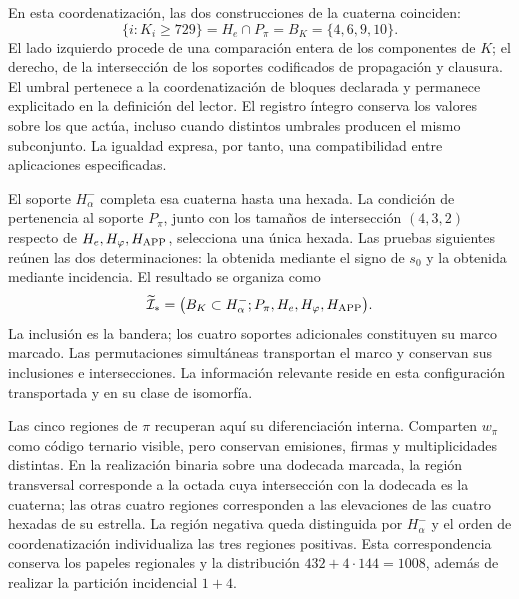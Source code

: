 En esta coordenatización, las dos construcciones de la cuaterna coinciden:
\begin{equation}
 \{i:K_i\geq729\}
 =H_e\cap P_\pi=B_K=\{4,6,9,10\}.
 \label{inc-ampl-cuaterna}
\end{equation}
El lado izquierdo procede de una comparación entera de los componentes
de $K$; el derecho, de la intersección de los soportes codificados de
propagación y clausura. El umbral pertenece a la coordenatización de bloques
declarada y permanece explicitado en la definición del lector. El
registro íntegro conserva los valores sobre los que actúa, incluso cuando
distintos umbrales producen el mismo subconjunto. La igualdad expresa,
por tanto, una compatibilidad entre aplicaciones especificadas.

El soporte $H^-_\alpha$ completa esa cuaterna hasta una hexada. La
condición de pertenencia al soporte $P_\pi$, junto con los tamaños de
intersección $(4,3,2)$ respecto de $H_e,H_\varphi,H_{\rm APP}$,
selecciona una única hexada. Las pruebas siguientes reúnen las dos
determinaciones: la obtenida mediante el signo de $s_0$ y la obtenida
mediante incidencia. El resultado se organiza como
\begin{equation}
 \widetilde{\mathcal I}_*
 =\bigl(B_K\subset H^-_\alpha;
         P_\pi,H_e,H_\varphi,H_{\rm APP}\bigr).
 \label{inc-ampl-marco}
\end{equation}
La inclusión es la bandera; los cuatro soportes adicionales constituyen
su marco marcado. Las permutaciones simultáneas transportan el marco y
conservan sus inclusiones e intersecciones. La información relevante reside
en esta configuración transportada y en su clase de isomorfía.

Las cinco regiones de $\pi$ recuperan aquí su diferenciación interna.
Comparten $w_\pi$ como código ternario visible, pero conservan emisiones,
firmas y multiplicidades distintas. En la realización binaria sobre una
dodecada marcada, la región transversal corresponde a la octada cuya
intersección con la dodecada es la cuaterna; las otras cuatro regiones
corresponden a las elevaciones de las cuatro hexadas de su estrella. La
región negativa queda distinguida por $H^-_\alpha$ y el orden de coordenatización
individualiza las tres regiones positivas. Esta correspondencia conserva
los papeles regionales y la distribución $432+4\cdot144=1008$, además
de realizar la partición incidencial $1+4$.

